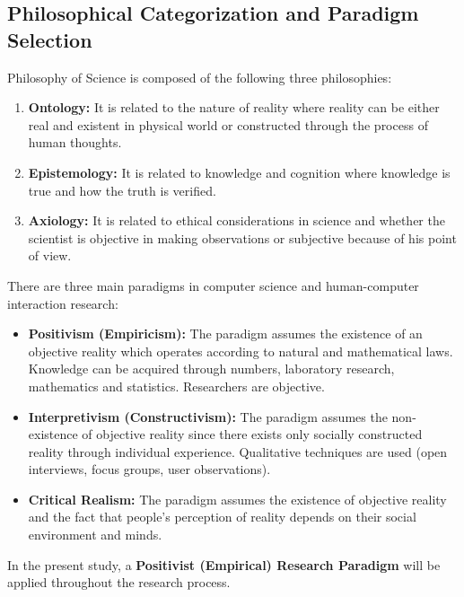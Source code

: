 \subsection{Philosophical Categorization and Paradigm Selection}
\label{subsec:meth_paradigm_selection}
Philosophy of Science is composed of the following three philosophies:
\begin{enumerate}
    \item \textbf{Ontology:} It is related to the nature of reality where reality can be either real and existent in physical world or constructed through the process of human thoughts.
    \item \textbf{Epistemology:} It is related to knowledge and cognition where knowledge is true and how the truth is verified.
    \item \textbf{Axiology:} It is related to ethical considerations in science and whether the scientist is objective in making observations or subjective because of his point of view.
\end{enumerate}

There are three main paradigms in computer science and human-computer interaction research:
\begin{itemize}
    \item \textbf{Positivism (Empiricism):} The paradigm assumes the existence of an objective reality which operates according to natural and mathematical laws. Knowledge can be acquired through numbers, laboratory research, mathematics and statistics. Researchers are objective.
    \item \textbf{Interpretivism (Constructivism):} The paradigm assumes the non-existence of objective reality since there exists only socially constructed reality through individual experience. Qualitative techniques are used (open interviews, focus groups, user observations).
    \item \textbf{Critical Realism:} The paradigm assumes the existence of objective reality and the fact that people's perception of reality depends on their social environment and minds.
\end{itemize}

In the present study, a \textbf{Positivist (Empirical) Research Paradigm} will be applied throughout the research process.

